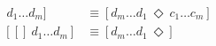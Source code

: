 \documentclass[10pt]{article}
\begin{document}
\begin{align*}[[c_1 \ldots c_n]~ d_1 \ldots d_m] &\equiv [d_m \ldots d_1 ~\Diamond~ c_1 \ldots c_m] \\
[[]~ d_1 \ldots d_m] &\equiv [d_m \ldots d_1 ~\Diamond] 
\end{align*}
\end{document}
